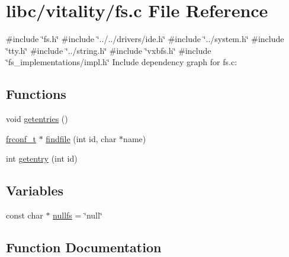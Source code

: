 \hypertarget{a00149}{}\section{libc/vitality/fs.c File Reference}
\label{a00149}
{\ttfamily \#include \char`\"{}fs.\+h\char`\"{}}\newline
{\ttfamily \#include \char`\"{}../../drivers/ide.\+h\char`\"{}}\newline
{\ttfamily \#include \char`\"{}../system.\+h\char`\"{}}\newline
{\ttfamily \#include \char`\"{}tty.\+h\char`\"{}}\newline
{\ttfamily \#include \char`\"{}../string.\+h\char`\"{}}\newline
{\ttfamily \#include \char`\"{}vxbfs.\+h\char`\"{}}\newline
{\ttfamily \#include \char`\"{}fs\+\_\+implementations/impl.\+h\char`\"{}}\newline
Include dependency graph for fs.\+c\+:
\subsection*{Functions}
\begin{DoxyCompactItemize}
\item 
void \hyperlink{a00149_a414110036132977c34813673360e1a63_a414110036132977c34813673360e1a63}{getentries} ()
\item 
\hyperlink{a00191_a752f1bef3c13b98d682fddc44a9e47c8_a752f1bef3c13b98d682fddc44a9e47c8}{frconf\+\_\+t} $\ast$ \hyperlink{a00149_a5c15724e6f3ef2c0df67ccedfc8639eb_a5c15724e6f3ef2c0df67ccedfc8639eb}{findfile} (int id, char $\ast$name)
\item 
int \hyperlink{a00149_a3fb32d07d3bd05144a196c94fc59c0d1_a3fb32d07d3bd05144a196c94fc59c0d1}{getentry} (int id)
\end{DoxyCompactItemize}
\subsection*{Variables}
\begin{DoxyCompactItemize}
\item 
const char $\ast$ \hyperlink{a00149_a36265ac74fd925405e1179e799961f1e_a36265ac74fd925405e1179e799961f1e}{nullfs} = \char`\"{}null\char`\"{}
\end{DoxyCompactItemize}


\subsection{Function Documentation}
\mbox{\label{a00149_a5c15724e6f3ef2c0df67ccedfc8639eb_a5c15724e6f3ef2c0df67ccedfc8639eb}} 
